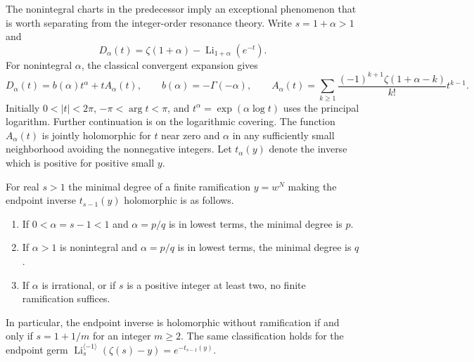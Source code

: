 The nonintegral charts in the predecessor imply an exceptional phenomenon
that is worth separating from the integer-order resonance theory.
Write $s=1+\alpha>1$ and
\[
 D_\alpha(t)=\zeta(1+\alpha)-\operatorname{Li}_{1+\alpha}(e^{-t}).
\]
For nonintegral $\alpha$, the classical convergent expansion \cite{rw:DLMFPolylog} gives
\[
 D_\alpha(t)=b(\alpha)t^\alpha+tA_\alpha(t),\qquad
 b(\alpha)=-\Gamma(-\alpha),\qquad
 A_\alpha(t)=\sum_{k\ge1}\frac{(-1)^{k+1}\zeta(1+\alpha-k)}{k!}t^{k-1}.
\]
Initially $0<|t|<2\pi$, $-\pi<\arg t<\pi$, and
$t^\alpha=\exp(\alpha\log t)$ uses the principal logarithm.
Further continuation is on the logarithmic covering.
The function $A_\alpha(t)$ is jointly holomorphic for $t$ near zero and
$\alpha$ in any sufficiently small neighborhood avoiding the nonnegative
integers.  Let $t_\alpha(y)$ denote the inverse which is positive for
positive small $y$.

\begin{theorem}\label{jct:thm:ramification}
For real $s>1$ the minimal degree of a finite ramification $y=w^N$
making the endpoint inverse $t_{s-1}(y)$ holomorphic is as follows.
\begin{enumerate}
\item If $0<\alpha=s-1<1$ and $\alpha=p/q$ is in lowest terms,
the minimal degree is $p$.
\item If $\alpha>1$ is nonintegral and $\alpha=p/q$ is in lowest
terms, the minimal degree is $q$.
\item If $\alpha$ is irrational, or if $s$ is a positive integer
at least two, no finite ramification suffices.
\end{enumerate}
In particular, the endpoint inverse is holomorphic without ramification
if and only if $s=1+1/m$ for an integer $m\ge2$.
The same classification holds for the endpoint germ
$\operatorname{Li}_{s}^{\langle-1\rangle}(\zeta(s)-y)=e^{-t_{s-1}(y)}$.
\end{theorem}

